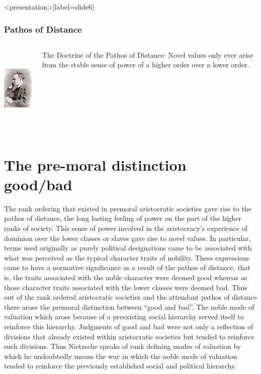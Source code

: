 \begin{frame}<presentation>[label=slide6]
    \frametitle{Pathos of Distance}
        \begin{columns}
            \begin{column}{3cm}
                \includegraphics[height=4cm]{../../graphics/nietzsche.jpg}
            \end{column}
            \begin{column}{7cm}
                \alert{The Doctrine of the Pathos of Distance}: Novel values only ever arise from the stable sense of power of a higher order over a lower order.
            \end{column}
        \end{columns}
\end{frame}


\section{The pre-moral distinction good/bad}\label{sec:the_pre_moral_distinction_good_bad} %

The rank ordering that existed in premoral aristocratic societies gave rise to the pathos of distance, the long lasting feeling of power on the part of the higher ranks of society. This sense of power involved in the aristocracy's experience of dominion over the lower classes or slaves gave rise to novel values. In particular, terms used originally as purely political designations came to be associated with what was perceived as the typical character traits of nobility. These expressions came to have a normative significance as a result of the pathos of distance, that is, the traits associated with the noble character were deemed good whereas as those character traits associated with the lower classes were deemed bad. Thus out of the rank ordered aristocratic societies and the attendant pathos of distance there arose the premoral distinction between ``good and bad''. The noble mode of valuation which arose because of a preexisting social hierarchy served itself to reinforce this hierarchy. Judgments of good and bad were not only a reflection of divisions that already existed within aristocratic societies but tended to reinforce such divisions. Thus Nietzsche speaks of rank defining modes of valuation by which he undoubtedly means the way in which the noble mode of valuation tended to reinforce the previously established social and political hierarchy.

